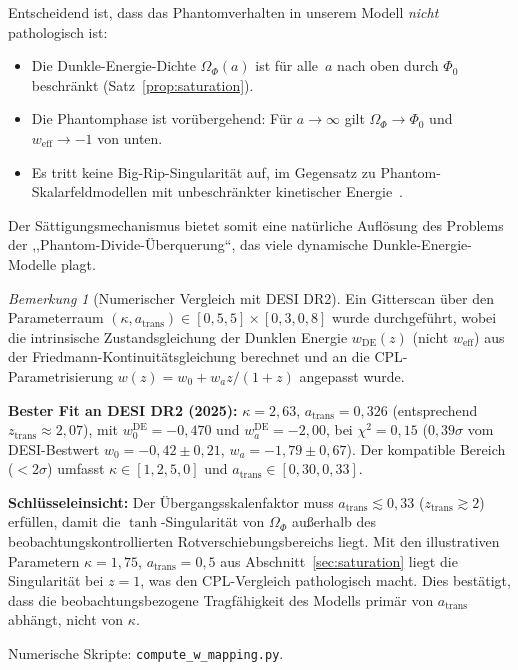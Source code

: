 \documentclass[12pt,a4paper]{article}
\theoremstyle{definition}
\theoremstyle{plain}
\theoremstyle{remark}
\newtheorem{remark}[definition]{Bemerkung}
\begin{document}
Entscheidend ist, dass das
Phantomverhalten in unserem Modell \emph{nicht} pathologisch ist:

\begin{itemize}
  \item Die Dunkle-Energie-Dichte $\Omega_{\Phi}(a)$ ist f\"ur alle~$a$
        nach oben durch $\Phi_{0}$ beschr\"ankt
        (Satz~\ref{prop:saturation}).
  \item Die Phantomphase ist vor\"ubergehend: F\"ur $a \to \infty$ gilt
        $\Omega_{\Phi} \to \Phi_{0}$ und
        $w_{\mathrm{eff}} \to -1$ von unten.
  \item Es tritt keine Big-Rip-Singularit\"at auf, im Gegensatz zu
        Phantom-Skalarfeldmodellen mit unbeschr\"ankter kinetischer
        Energie~\cite{Carroll2001}.
\end{itemize}
Der S\"attigungsmechanismus bietet somit eine nat\"urliche Aufl\"osung
des Problems der ,,Phantom-Divide-\"Uberquerung``, das viele dynamische
Dunkle-Energie-Modelle plagt.

\begin{remark}[Numerischer Vergleich mit DESI DR2]\label{rem:desi-comparison}
Ein Gitterscan \"uber den Parameterraum $(\kappa, a_{\mathrm{trans}}) \in [0{,}5, 5] \times [0{,}3, 0{,}8]$ wurde durchgef\"uhrt, wobei die intrinsische Zustandsgleichung der Dunklen Energie $w_{\mathrm{DE}}(z)$ (nicht $w_{\mathrm{eff}}$) aus der Friedmann-Kontinuit\"atsgleichung berechnet und an die CPL-Parametrisierung $w(z) = w_0 + w_a z/(1+z)$ angepasst wurde.

\smallskip\noindent\textbf{Bester Fit an DESI DR2 (2025):} $\kappa = 2{,}63$, $a_{\mathrm{trans}} = 0{,}326$ (entsprechend $z_{\mathrm{trans}} \approx 2{,}07$), mit $w_0^{\mathrm{DE}} = -0{,}470$ und $w_a^{\mathrm{DE}} = -2{,}00$, bei $\chi^2 = 0{,}15$ ($0{,}39\sigma$ vom DESI-Bestwert $w_0 = -0{,}42 \pm 0{,}21$, $w_a = -1{,}79 \pm 0{,}67$). Der kompatible Bereich ($<2\sigma$) umfasst $\kappa \in [1{,}2, 5{,}0]$ und $a_{\mathrm{trans}} \in [0{,}30, 0{,}33]$.

\smallskip\noindent\textbf{Schl\"usseleinsicht:} Der \"Ubergangsskalenfaktor muss $a_{\mathrm{trans}} \lesssim 0{,}33$ ($z_{\mathrm{trans}} \gtrsim 2$) erf\"ullen, damit die $\tanh$-Singularit\"at von $\Omega_\Phi$ au\ss erhalb des beobachtungskontrollierten Rotverschiebungsbereichs liegt. Mit den illustrativen Parametern $\kappa = 1{,}75$, $a_{\mathrm{trans}} = 0{,}5$ aus Abschnitt~\ref{sec:saturation} liegt die Singularit\"at bei $z = 1$, was den CPL-Vergleich pathologisch macht. Dies best\"atigt, dass die beobachtungsbezogene Tragf\"ahigkeit des Modells prim\"ar von $a_{\mathrm{trans}}$ abh\"angt, nicht von $\kappa$.

\smallskip\noindent Numerische Skripte: \texttt{compute\_w\_mapping.py}.
\end{remark}
\end{document}
